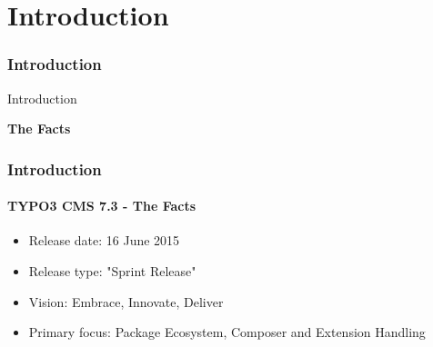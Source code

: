 %

\section{Introduction}
\begin{frame}[fragile]
	\frametitle{Introduction}

	\begin{center}\huge{Introduction}\end{center}
	\begin{center}\huge{\color{typo3darkgrey}\textbf{The Facts}}\end{center}

\end{frame}

\begin{frame}[fragile]
	\frametitle{Introduction}
	\framesubtitle{TYPO3 CMS 7.3 - The Facts}

	\begin{itemize}
		\item Release date: 16 June 2015
		\item Release type: "Sprint Release"
		\item Vision: Embrace, Innovate, Deliver
		\item Primary focus: Package Ecosystem, Composer and Extension Handling
	\end{itemize}

\end{frame}

